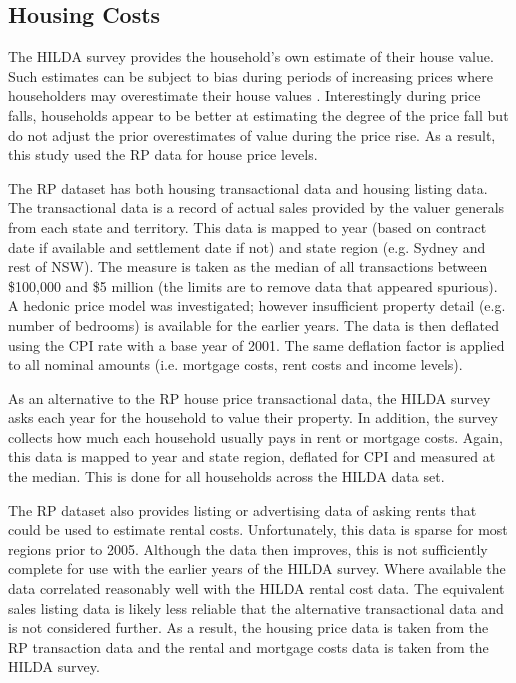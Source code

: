 \documentclass[12pt]{article}
\begin{document}
\subsection{Housing Costs}
The HILDA survey provides the household's own estimate of their house value. Such estimates can be subject to bias during periods of increasing prices where householders may overestimate their house values \parencite{henriques2013perceptions}. Interestingly during price falls, households appear to be better at estimating the degree of the price fall but do not adjust the prior overestimates of value during the price rise. As a result, this study used the RP data for house price levels.

The RP dataset has both housing transactional data and housing listing data. The transactional data is a record of actual sales provided by the valuer generals from each state and territory. This data is mapped to year (based on contract date if available and settlement date if not) and state region (e.g. Sydney and rest of NSW). The measure is taken as the median of all transactions between \$100,000 and \$5 million (the limits are to remove data that appeared spurious). A hedonic price model was investigated; however insufficient property detail (e.g. number of bedrooms) is available for the earlier years. The data is then deflated using the CPI rate with a base year of 2001. The same deflation factor is applied to all nominal amounts (i.e. mortgage costs, rent costs and income levels).

As an alternative to the RP house price transactional data, the HILDA survey asks each year for the household to value their property. In addition, the survey collects how much each household usually pays in rent or mortgage costs. Again, this data is mapped to year and state region, deflated for CPI and measured at the median. This is done for all households across the HILDA data set.

The RP dataset also provides listing or advertising data of asking rents that could be used to estimate rental costs. Unfortunately, this data is sparse for most regions prior to 2005. Although the data then improves, this is not sufficiently complete for use with the earlier years of the HILDA survey. Where available the data correlated reasonably well with the HILDA rental cost data. The equivalent sales listing data is likely less reliable that the alternative transactional data and is not considered further. As a result, the housing price data is taken from the RP transaction data and the rental and mortgage costs data is taken from the HILDA survey.
\end{document}
